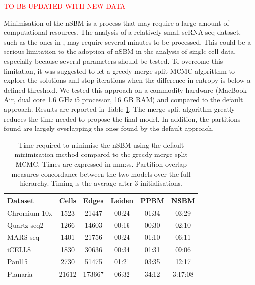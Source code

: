 \documentclass[10pt]{article}
\begin{document}
\textcolor{red}{TO BE UPDATED WITH NEW DATA}

Minimisation of the nSBM is a process that may require a large amount of computational resources. The analysis of a relatively small scRNA-seq dataset, such as the ones in \cite{mereu_2020}, may require several minutes to be processed. This could be a serious limitation to the adoption of nSBM in the analysis of single cell data, especially because several parameters should be tested. To overcome this limitation, it was suggested to let a greedy merge-split MCMC algoritthm \cite{peixoto_2020} to explore the solutions and stop iterations when the difference in entropy is below a defined threshold. We tested this approach on a commodity hardware (MacBook Air, dual core 1.6 GHz i5 processor, 16 GB RAM) and compared to the default approach. Results are reported in Table \ref{Table1}. The merge-split algorithm greatly reduces the time needed to propose the final model. In addition, the partitions found are largely overlapping the ones found by the default approach. 

\begin{table}[h!]
\centering
 \begin{tabular}{|| l c c c c c ||}
 \hline
 \textbf{Dataset} & \textbf{Cells} & \textbf{Edges} & \textbf{Leiden} & \textbf{PPBM} & \textbf{NSBM} \\ [0.5ex] 
 \hline\hline
 Chromium 10x \cite{mereu_2020} & 1523 & 21447 & 00:24 & 01:34 & 03:29\\ 
 \hline
 Quartz-seq2 \cite{mereu_2020} & 1266 & 14603 & 00:16 & 00:30 & 02:10 \\
 \hline
 MARS-seq \cite{mereu_2020} & 1401 & 21756 & 00:24 & 01:10 & 06:11 \\
 \hline
 iCELL8 \cite{mereu_2020} & 1830 & 30636 & 00:34 & 01:31 & 09:06 \\
 \hline
 Paul15 \cite{paul_2015} & 2730 & 51475 & 01:21 & 03:35 & 12:17\\ 
 \hline
 Planaria \cite{plass_2018} & 21612 & 173667 & 06:32 & 34:12 & 3:17:08 \\
 \hline
\end{tabular}
\caption{Time required to minimise the nSBM using the default minimization method compared to the greedy merge-split MCMC. Times are expressed in mm:ss. Partition overlap measures concordance between the two models over the full hierarchy. Timing is the average after 3 initialisations.}
\label{Table1}
\end{table}
\end{document}
